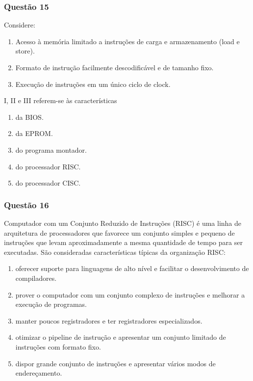 \documentclass[	aspectratio=169,
				xcolor=table]{beamer}
\begin{document}
	\begin{frame}
		\frametitle{Questão 15}
		Considere:
		\begin{enumerate}[i]
			\item Acesso à memória limitado a instruções de carga e armazenamento (load e store). 
			\item Formato de instrução facilmente descodificável e de tamanho fixo. 
			\item Execução de instruções em um único ciclo de clock. 			
		\end{enumerate}


		I, II e III referem-se às características
		
		\begin{enumerate}[a]
			\item da BIOS.
			\item da EPROM.
			\item do programa montador.
			\item do processador RISC.
			\item do processador CISC.			
		\end{enumerate}
	
	\end{frame}

	\begin{frame}
		\frametitle{Questão 16}
		Computador com um Conjunto Reduzido de Instruções (RISC) é uma linha de arquitetura de processadores que favorece um conjunto simples e pequeno de instruções que levam aproximadamente a mesma quantidade de tempo para ser executadas. São
consideradas características típicas da organização RISC:
		\begin{enumerate}[a]
		\large
			\item oferecer suporte para linguagens de alto nível e facilitar o desenvolvimento de compiladores.
			\item prover o computador com um conjunto complexo de instruções e melhorar a execução de programas.
			\item manter poucos registradores e ter registradores especializados.
			\item otimizar o pipeline de instrução e apresentar um conjunto limitado de instruções com formato fixo.
			\item dispor grande conjunto de instruções e apresentar vários modos de endereçamento.				
		\end{enumerate}

	\end{frame}	
\end{document}
